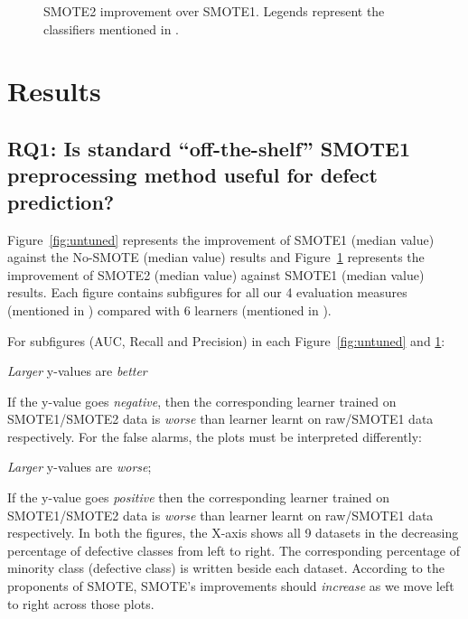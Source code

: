 \begin{figure}[!t]
    \caption{SMOTE2 improvement over SMOTE1. Legends represent the classifiers mentioned in .}
    \vspace{-10pt}
    \label{fig:tuned}
\end{figure}

\section{Results}
\label{sect:results}

\subsection{\textbf{RQ1: Is standard ``off-the-shelf'' SMOTE1 preprocessing method useful for defect prediction?}}
Figure~\ref{fig:untuned} represents the improvement of SMOTE1 (median value) against the No-SMOTE (median value) results and Figure~\ref{fig:tuned} represents the improvement of SMOTE2 (median value) against SMOTE1 (median value) results. Each figure contains subfigures for all our 4 evaluation measures (mentioned in ) compared with 6 learners (mentioned in ). 



For subfigures (AUC, Recall and Precision) in each Figure~\ref{fig:untuned} and \ref{fig:tuned}:
\bi
\item 
{\em Larger} y-values
are {\em better} 
\item
If the y-value goes {\em negative}, then the corresponding learner trained on SMOTE1/SMOTE2 data is {\em worse} than learner learnt on raw/SMOTE1 data respectively. 
\ei
For the false alarms, the
plots must be interpreted differently:
\bi
\item
{\em Larger} y-values are {\em worse};
\item
If the y-value goes {\em positive} then the corresponding learner trained on SMOTE1/SMOTE2 data is {\em worse} than learner learnt on raw/SMOTE1 data respectively.
\ei
In both the figures, the
X-axis shows all 9 datasets in the decreasing percentage of defective classes from left to right. The corresponding percentage of minority class (defective class) is written beside each dataset. 
According to the proponents
of SMOTE, SMOTE's improvements should
{\em increase} as we move left to right
across those plots.

